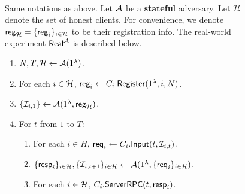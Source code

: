 \begin{figure}[h!]
\begin{framed}
\begin{definition} \hfill\\
\label{defn:real-world}
Same notations as above. Let $\mathcal{A}$ be a \textbf{stateful} adversary. Let $\mathcal{H}$ denote the set of honest clients. For convenience, we denote $\mathsf{reg}_{\mathcal{H}} = \{\mathsf{reg}_i\}_{i \in\mathcal{H}}$ to be their registration info. The real-world experiment $\mathsf{Real}^{\mathcal{A}}$ is described below.
\begin{enumerate}
\item $N, T, \mathcal{H} \leftarrow \mathcal{A}(1^{\lambda})$.
\item For each $i \in \mathcal{H}$, $\mathsf{reg}_i \leftarrow C_i.\mathsf{Register}(1^{\lambda}, i, N)$. 
\item $\{\mathcal{I}_{i, 1}\} \leftarrow \mathcal{A}(1^{\lambda}, \mathsf{reg}_{\mathcal{H}})$.
\item For $t$ from $1$ to $T$:
    \begin{enumerate}
    \item For each $i \in H$, $\mathsf{req}_i \leftarrow C_i.\mathsf{Input}(t, \mathcal{I}_{i, t})$.
    
    \item $\{\mathsf{resp}_i\}_{i \in \mathcal{H}}, \{\mathcal{I}_{i, t + 1}\}_{i \in \mathcal{H}} \leftarrow \mathcal{A}(1^{\lambda}, \{\mathsf{req}_i\}_{i \in \mathcal{H}})$.
    
    \item For each $i \in \mathcal{H}$, $C_i.\mathsf{ServerRPC}(t, \mathsf{resp}_i)$.
    \end{enumerate}
\end{enumerate}
\end{definition}
\end{framed}
\end{figure}

